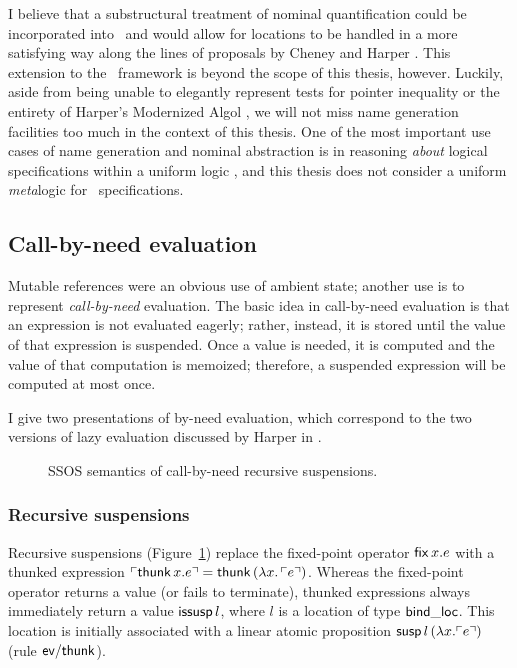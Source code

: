 I believe that a substructural treatment of nominal quantification
could be incorporated into \sls~and would allow for locations to be
handled in a more satisfying way along the lines of proposals by
Cheney and Harper \cite{cheney12dependent,harper12practical}. This
extension to the \sls~framework is beyond the scope of this thesis,
however. Luckily, aside from being unable to elegantly represent tests
for pointer inequality or the entirety of Harper's Modernized Algol
\cite[Chapter 35]{harper12practical}, we will not miss name generation
facilities too much in the context of this thesis. One of the most important
use cases of name generation and nominal abstraction is in reasoning
{\it about} logical specifications within a uniform logic
\cite{gacek11nominal}, and this thesis does not consider a uniform {\it
  meta}logic for \sls~specifications.

\subsection{Call-by-need evaluation}
\label{sec:call-by-need}

Mutable references were
an obvious use of ambient state; another use is to
represent {\it call-by-need} evaluation. The basic idea in
call-by-need evaluation is that an expression is not evaluated
eagerly; rather, instead, it is stored until the value of that
expression is suspended. Once a value is
needed, it is computed and the value of that computation is memoized;
therefore, a suspended expression will be computed at most once.

I give two presentations of by-need evaluation, which correspond to
the two versions of lazy evaluation discussed by Harper in
\cite[Chapter 37]{harper12practical}.



\begin{figure}[t]
\caption{SSOS semantics of call-by-need recursive suspensions.}
\label{fig:ssos-cbneed}
\end{figure}

\subsubsection{Recursive suspensions}


Recursive suspensions (Figure~\ref{fig:ssos-cbneed}) replace the
fixed-point operator ${\sf fix}\,x.e$ with a thunked expression
${\ulcorner{{\sf thunk}\,x.e}\urcorner} = {\sf thunk}\,(\lambda
x.\,{\ulcorner{e}\urcorner})$. Whereas the fixed-point operator returns a value (or
fails to terminate), thunked expressions always immediately return a
value ${\sf issusp}\,l$, where $l$ is a location of type ${\sf
  bind\_loc}$. This location is initially associated with a linear
atomic proposition ${\sf susp}\,l\,(\lambda x.{\ulcorner{e}\urcorner})$ (rule ${\sf
  ev/thunk}$).

